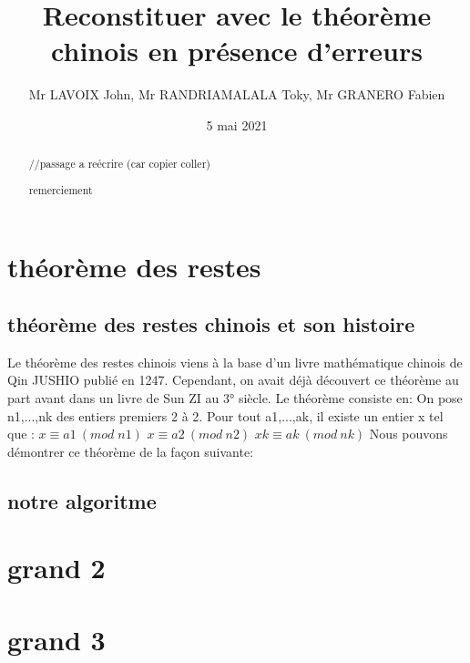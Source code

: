 \documentclass[a4paper, 11pt]{article}
\begin{document}
\title {Reconstituer avec le théorème chinois en présence d’erreurs}
\author{Mr LAVOIX John, Mr RANDRIAMALALA Toky, Mr GRANERO Fabien }
\date{5 mai 2021}



\begin{abstract}

//passage a reécrire (car copier coller) 
\end{abstract}

\newpage

\tableofcontents

\newpage
\begin{abstract}
    remerciement
\end{abstract}

\newpage
\section{théorème des restes}
\subsection{théorème des restes chinois et son histoire}
Le théorème des restes chinois viens à la base d’un livre mathématique chinois de Qin JUSHIO publié en 1247. Cependant, on avait déjà découvert ce théorème au part avant dans un livre de Sun ZI au 3° siècle. Le théorème consiste en:
On pose n1,...,nk des entiers premiers 2 à 2. Pour tout a1,...,ak, il existe un entier x tel que :
\newline
$ x\equiv a1 \: (mod \;  n1)$ 
\newline
$ x\equiv a2 \: (mod \: n2)$
\newline
$ xk \equiv ak \:(mod\: nk)$
\newline
Nous pouvons démontrer ce théorème de la façon suivante:

\subsection{notre algoritme}

\newpage
\section{grand 2}

\newpage
\section{grand 3}
\end{document}
